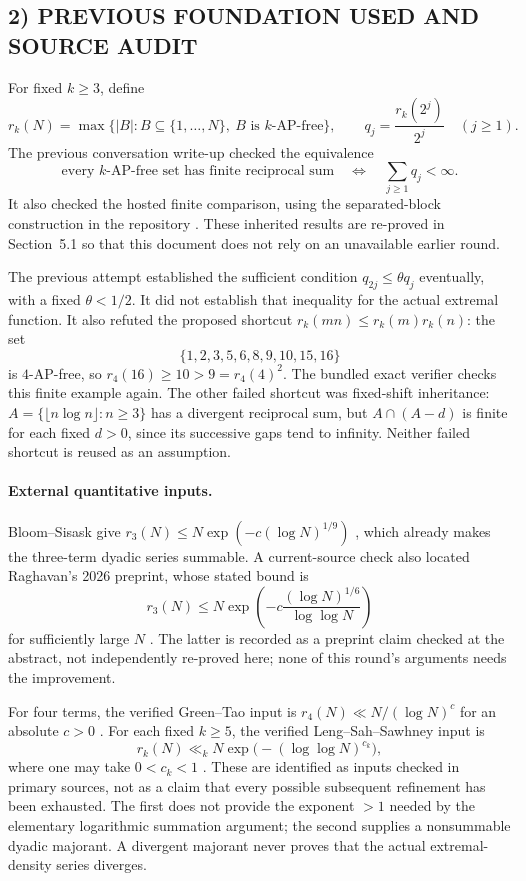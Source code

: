 \subsection{2) PREVIOUS FOUNDATION USED AND SOURCE AUDIT}

For fixed $k\ge3$, define
\[
r_k(N)=\max\{|B|:B\subseteq\{1,\ldots,N\},\ B\text{ is }k\text{-AP-free}\},
\qquad q_j=\frac{r_k(2^j)}{2^j}\quad(j\ge1).
\]
The previous conversation write-up \cite{previous} checked the equivalence
\begin{equation}\label{r2:equiv}
\text{every $k$-AP-free set has finite reciprocal sum}
\quad\Longleftrightarrow\quad
\sum_{j\ge1}q_j<\infty.
\end{equation}
It also checked the hosted finite comparison, using the separated-block construction in the repository \cite{hosted}. These inherited results are re-proved in Section~5.1 so that this document does not rely on an unavailable earlier round.

The previous attempt established the sufficient condition $q_{2j}\le\theta q_j$ eventually, with a fixed $\theta<1/2$. It did not establish that inequality for the actual extremal function. It also refuted the proposed shortcut $r_k(mn)\le r_k(m)r_k(n)$: the set
\[
\{1,2,3,5,6,8,9,10,15,16\}
\]
is $4$-AP-free, so $r_4(16)\ge10>9=r_4(4)^2$. The bundled exact verifier checks this finite example again. The other failed shortcut was fixed-shift inheritance: $A=\{\lfloor n\log n\rfloor:n\ge3\}$ has a divergent reciprocal sum, but $A\cap(A-d)$ is finite for each fixed $d>0$, since its successive gaps tend to infinity. Neither failed shortcut is reused as an assumption.

\paragraph{External quantitative inputs.}
Bloom--Sisask give $r_3(N)\le N\exp(-c(\log N)^{1/9})$ \cite{bs}, which already makes the three-term dyadic series summable. A current-source check also located Raghavan's 2026 preprint, whose stated bound is
\[
r_3(N)\le N\exp\!\left(-c\frac{(\log N)^{1/6}}{\log\log N}\right)
\]
for sufficiently large $N$ \cite{rag}. The latter is recorded as a preprint claim checked at the abstract, not independently re-proved here; none of this round's arguments needs the improvement.

For four terms, the verified Green--Tao input is $r_4(N)\ll N/(\log N)^c$ for an absolute $c>0$ \cite{gt}. For each fixed $k\ge5$, the verified Leng--Sah--Sawhney input is
\[
r_k(N)\ll_k N\exp\bigl(- (\log\log N)^{c_k}\bigr),
\]
where one may take $0<c_k<1$ \cite{lss}. These are identified as inputs checked in primary sources, not as a claim that every possible subsequent refinement has been exhausted. The first does not provide the exponent $>1$ needed by the elementary logarithmic summation argument; the second supplies a nonsummable dyadic majorant. A divergent majorant never proves that the actual extremal-density series diverges.

